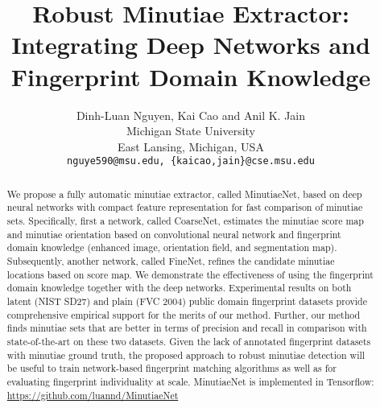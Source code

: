 \documentclass[10pt,twocolumn,letterpaper]{article}
\begin{document}
\title{Robust Minutiae Extractor:\\ Integrating Deep Networks and Fingerprint Domain Knowledge}

\author{Dinh-Luan Nguyen, Kai Cao and Anil K. Jain\\
Michigan State University\\
East Lansing, Michigan, USA\\
{\tt\small nguye590@msu.edu, \{kaicao,jain\}@cse.msu.edu}
}

\maketitle
\thispagestyle{empty}

\begin{abstract}
	We propose a fully automatic minutiae extractor, called MinutiaeNet, based on deep neural networks with compact feature representation for fast comparison of minutiae sets. Specifically, first a network, called CoarseNet, estimates the minutiae score map and minutiae orientation based on convolutional neural network and fingerprint domain knowledge (enhanced image, orientation field, and segmentation map). Subsequently, another network, called FineNet, refines the candidate minutiae locations based on score map. We demonstrate the effectiveness of using the fingerprint domain knowledge together with the deep networks. Experimental results on both latent (NIST SD27) and plain (FVC 2004) public domain fingerprint datasets provide comprehensive empirical support for the merits of our method. Further, our method finds minutiae sets that are better in terms of precision and recall in comparison with state-of-the-art on these two datasets. Given the lack of annotated fingerprint datasets with minutiae ground truth, the proposed approach to robust minutiae detection will be useful to train network-based fingerprint matching algorithms as well as for evaluating fingerprint individuality at scale. MinutiaeNet is implemented in Tensorflow: \href{https://github.com/luannd/MinutiaeNet}{https://github.com/luannd/MinutiaeNet} \end{abstract}

\end{document}
